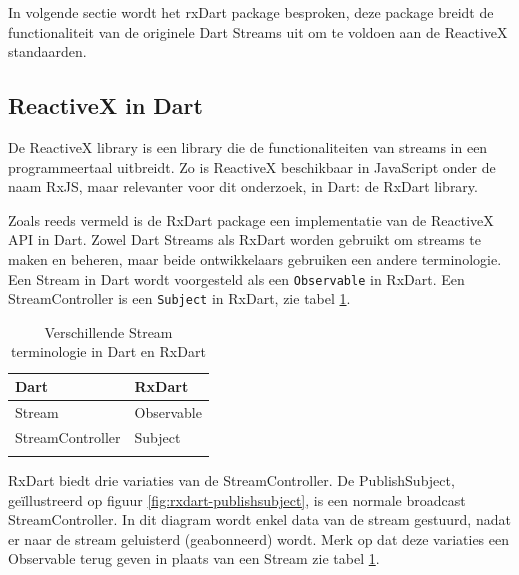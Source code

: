 In volgende sectie wordt het rxDart package besproken, deze package breidt de functionaliteit van de originele Dart Streams uit om te voldoen aan de ReactiveX standaarden.

\subsection*{ReactiveX in Dart}
\label{ch:reactivex}
De ReactiveX library is een library die de functionaliteiten van streams in een programmeertaal uitbreidt. Zo is ReactiveX beschikbaar in JavaScript onder de naam RxJS, maar relevanter voor dit onderzoek, in Dart: de RxDart library.


Zoals reeds vermeld is de RxDart package een implementatie van de ReactiveX API in Dart. Zowel Dart Streams als RxDart worden gebruikt om streams te maken en beheren, maar beide ontwikkelaars gebruiken een andere terminologie.
Een Stream in Dart wordt voorgesteld als een \verb|Observable| in RxDart. Een StreamController is een \verb|Subject| in RxDart, zie tabel \ref{table:terminologie-rxdart-dart}.

\begin{table}[H]
    \centering
    \begin{tabular}{ll}
        \textbf{Dart}    & \textbf{RxDart} \\ \hline
        Stream           & Observable      \\
        StreamController & Subject         \\
        &                
    \end{tabular}
    \caption{Verschillende Stream terminologie in Dart en RxDart \autocite{Boelens2018}}
    \label{table:terminologie-rxdart-dart}
\end{table}

RxDart biedt drie variaties van de StreamController.
\newline 
De PublishSubject, geïllustreerd op figuur \ref{fig:rxdart-publishsubject}, is een normale broadcast StreamController. In dit diagram wordt enkel data van de stream gestuurd, nadat er naar de stream geluisterd (geabonneerd) wordt.
Merk op dat deze variaties een Observable terug geven in plaats van een Stream zie tabel \ref{table:terminologie-rxdart-dart}.


